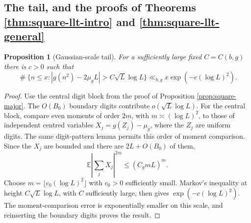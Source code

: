 \documentclass[11pt,reqno]{amsart}
\theoremstyle{plain}
\newtheorem{proposition}[theorem]{Proposition}
\theoremstyle{definition}
\newcommand{\1}{\mathbf 1}
\DeclareMathOperator{\Card}{\#}
\begin{document}
\subsection{The tail, and the proofs of Theorems \ref{thm:square-llt-intro} and \ref{thm:square-llt-general}}

\begin{proposition}[Gaussian-scale tail]\label{prop:square-tail}
For a sufficiently large fixed $C=C(b,g)$ there is $c>0$ such that
\begin{equation}\label{eq:square-tail}
 \Card\{n\le x:|g(n^2)-2\mu_gL|>C\sqrt L\log L\}
 \ll_{b,g}x\exp(-c(\log L)^2).
\end{equation}
\end{proposition}

\begin{proof}
Use the central digit block from the proof of Proposition \ref{prop:square-major}.  The $O(B_0)$ boundary digits contribute $o(\sqrt L\log L)$.  For the central block, compare even moments of order $2m$, with $m\asymp(\log L)^2$, to those of independent centred variables
$X_j=g(Z_j)-\mu_g$, where the $Z_j$ are uniform digits.  The same digit-pattern lemma permits this order of moment comparison.  Since the $X_j$ are bounded and there are $2L+O(B_0)$ of them,
\[
 \mathbb E\left|\sum_jX_j\right|^{2m}\le (C_gmL)^m.
\]
Choose $m=\lfloor c_0(\log L)^2\rfloor$ with $c_0>0$ sufficiently small.  Markov's inequality at height $C\sqrt L\log L$, with $C$ sufficiently large, then gives $\exp(-c(\log L)^2)$.  The moment-comparison error is exponentially smaller on this scale, and reinserting the boundary digits proves the result.
\end{proof}
\end{document}
